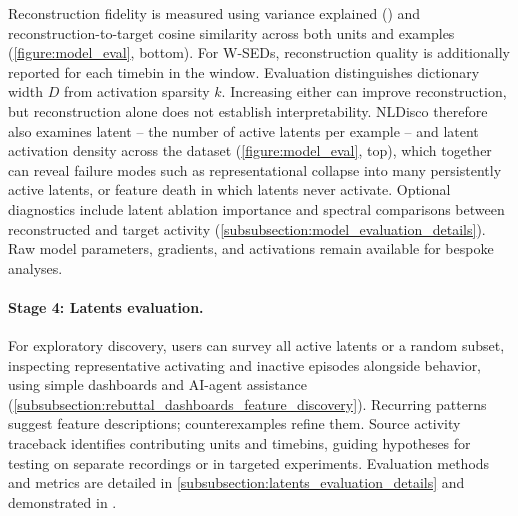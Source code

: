 Reconstruction fidelity is measured using variance explained () and reconstruction-to-target cosine similarity across both units and examples (\autoref{figure:model_eval}, bottom). For W-SEDs, reconstruction quality is additionally reported for each timebin in the window. Evaluation distinguishes dictionary width $D$ from activation sparsity $k$. Increasing either can improve reconstruction, but reconstruction alone does not establish interpretability. NLDisco therefore also examines latent  -- the number of active latents per example -- and latent activation density across the dataset (\autoref{figure:model_eval}, top), which together can reveal failure modes such as representational collapse into many persistently active latents, or feature death in which latents never activate. Optional diagnostics include latent ablation importance and spectral comparisons between reconstructed and target activity (\hyperref[subsubsection:model_evaluation_details]{\ref*{subsubsection:model_evaluation_details}}). Raw model parameters, gradients, and activations remain available for bespoke analyses.

\paragraph{Stage 4: Latents evaluation.}

For exploratory discovery, users can survey all active latents or a random subset, inspecting representative activating and inactive episodes alongside behavior, using simple dashboards and AI-agent assistance (\hyperref[subsubsection:rebuttal_dashboards_feature_discovery]{\ref*{subsubsection:rebuttal_dashboards_feature_discovery}}). Recurring patterns suggest feature descriptions; counterexamples refine them. Source activity traceback identifies contributing units and timebins, guiding hypotheses for testing on separate recordings or in targeted experiments. Evaluation methods and metrics are detailed in \hyperref[subsubsection:latents_evaluation_details]{\ref*{subsubsection:latents_evaluation_details}} and demonstrated in .
